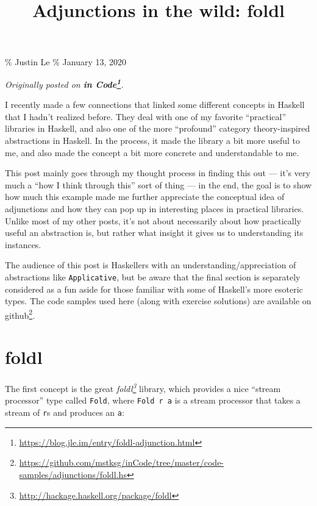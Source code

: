 \documentclass[]{article}
\title{Adjunctions in the wild: foldl}
\renewcommand{\href}[2]{#2\footnote{\url{#1}}}
\begin{document}
\maketitle

\% Justin Le \% January 13, 2020

\emph{Originally posted on
\textbf{\href{https://blog.jle.im/entry/foldl-adjunction.html}{in Code}}.}

I recently made a few connections that linked some different concepts in Haskell
that I hadn't realized before. They deal with one of my favorite ``practical''
libraries in Haskell, and also one of the more ``profound'' category
theory-inspired abstractions in Haskell. In the process, it made the library a
bit more useful to me, and also made the concept a bit more concrete and
understandable to me.

This post mainly goes through my thought process in finding this out --- it's
very much a ``how I think through this'' sort of thing --- in the end, the goal
is to show how much this example made me further appreciate the conceptual idea
of adjunctions and how they can pop up in interesting places in practical
libraries. Unlike most of my other posts, it's not about necessarily about how
practically useful an abstraction is, but rather what insight it gives us to
understanding its instances.

The audience of this post is Haskellers with an understanding/appreciation of
abstractions like \texttt{Applicative}, but be aware that the final section is
separately considered as a fun aside for those familiar with some of Haskell's
more esoteric types. The code samples used here (along with exercise solutions)
are
\href{https://github.com/mstksg/inCode/tree/master/code-samples/adjunctions/foldl.hs}{available
on github}.

\section{foldl}\label{foldl}

The first concept is the great
\emph{\href{http://hackage.haskell.org/package/foldl}{foldl}} library, which
provides a nice ``stream processor'' type called \texttt{Fold}, where
\texttt{Fold\ r\ a} is a stream processor that takes a stream of \texttt{r}s and
produces an \texttt{a}:
\end{document}
